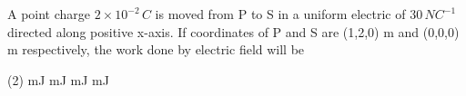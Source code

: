 \item A point charge \(2 \times 10^{-2} \, C\) is moved from P to S in a uniform electric of \(30 \, NC^{-1}\) directed along positive x-axis. If coordinates of P and S are (1,2,0) m and (0,0,0) m respectively, the work done by electric field will be
    \begin{tasks}(2)
         mJ
         mJ
         mJ
         mJ
    \end{tasks}